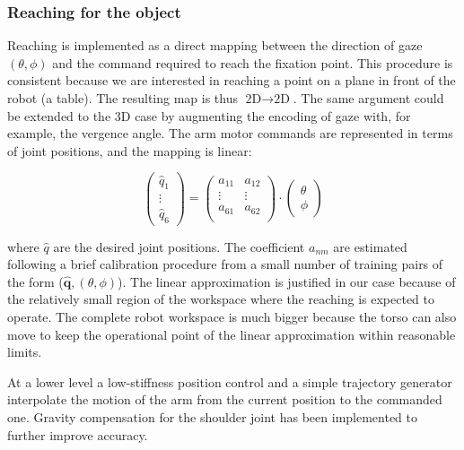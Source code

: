
\subsubsection*{Reaching for the object}

Reaching is implemented as a direct mapping between the direction of gaze 
$(\theta,\phi)$ and the command required to reach the fixation point. This 
procedure is consistent because we are interested in reaching a 
point on a plane in front of the robot (a table). The resulting map is thus
$\textrm{2D} \to \textrm{2D}$. The same argument could be extended to the 3D
case by augmenting the encoding of gaze with, for example, the vergence angle. 
The arm motor commands are represented in terms of joint positions,
and the mapping is linear:

\begin{equation} \label{eq:reachmap}
\left( \begin{array}{c}
\hat{q}_1\\
\vdots\\
\hat{q}_6
\end{array}
\right) = 
\left( \begin{array}{cc}
a_{11} & a_{12} \\
\vdots & \vdots \\
a_{61} & a_{62} \\
\end{array}
\right) 
\cdot 
\left( \begin{array}{c}
\theta \\
\phi
\end{array}
\right)
\end{equation}

\noindent where $\hat{q}$ are the desired joint positions. The coefficient
$a_{nm}$ are estimated following a brief calibration procedure from a small 
number of training pairs of the form ($\mathbf{\hat{q}}, (\theta, \phi)$).
The linear approximation is justified in our case because of the relatively small 
region of the workspace where the reaching is expected to operate. The 
complete robot workspace is much bigger because the torso can also move to keep
the operational point of the linear approximation within reasonable limits.

At a lower level a low-stiffness position control and a simple trajectory generator
interpolate the motion of the arm from the current position to the commanded one.
Gravity compensation for the shoulder joint has been implemented to further 
improve accuracy.

